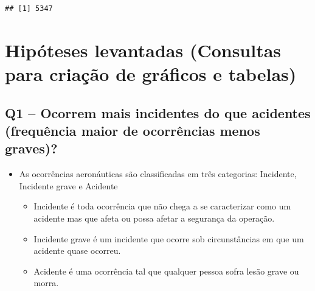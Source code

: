 \documentclass[
]{article}
\begin{document}
\begin{verbatim}
## [1] 5347
\end{verbatim}

\hypertarget{hipuxf3teses-levantadas-consultas-para-criauxe7uxe3o-de-gruxe1ficos-e-tabelas}{%
\section{Hipóteses levantadas (Consultas para criação de gráficos e
tabelas)}\label{hipuxf3teses-levantadas-consultas-para-criauxe7uxe3o-de-gruxe1ficos-e-tabelas}}

\hypertarget{q1-ocorrem-mais-incidentes-do-que-acidentes-frequuxeancia-maior-de-ocorruxeancias-menos-graves}{%
\subsection{Q1 -- Ocorrem mais incidentes do que acidentes (frequência
maior de ocorrências menos
graves)?}\label{q1-ocorrem-mais-incidentes-do-que-acidentes-frequuxeancia-maior-de-ocorruxeancias-menos-graves}}

\begin{itemize}
\item
  As ocorrências aeronáuticas são classificadas em três categorias:
  Incidente, Incidente grave e Acidente

  \begin{itemize}
  \item
    Incidente é toda ocorrência que não chega a se caracterizar como um
    acidente mas que afeta ou possa afetar a segurança da operação.
  \item
    Incidente grave é um incidente que ocorre sob circunstâncias em que
    um acidente quase ocorreu.
  \item
    Acidente é uma ocorrência tal que qualquer pessoa sofra lesão grave
    ou morra.
  \end{itemize}
\end{itemize}
\end{document}
